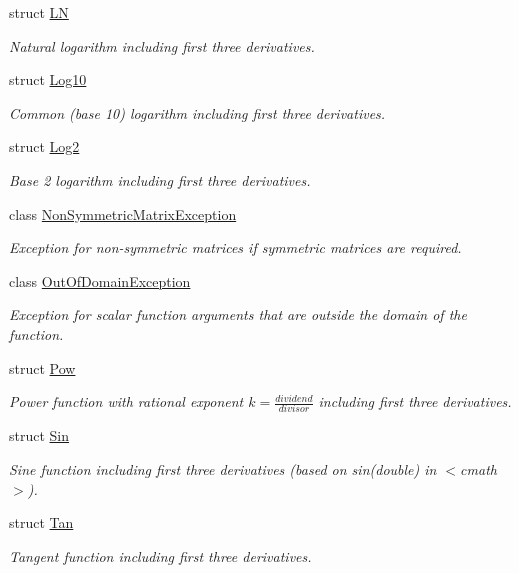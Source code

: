 \begin{DoxyCompactItemize}
struct \hyperlink{structFunG_1_1LN}{L\+N}
\begin{DoxyCompactList}\small\item\em Natural logarithm including first three derivatives. \end{DoxyCompactList}\item 
struct \hyperlink{structFunG_1_1Log10}{Log10}
\begin{DoxyCompactList}\small\item\em Common (base 10) logarithm including first three derivatives. \end{DoxyCompactList}\item 
struct \hyperlink{structFunG_1_1Log2}{Log2}
\begin{DoxyCompactList}\small\item\em Base 2 logarithm including first three derivatives. \end{DoxyCompactList}\item 
class \hyperlink{classFunG_1_1NonSymmetricMatrixException}{Non\+Symmetric\+Matrix\+Exception}
\begin{DoxyCompactList}\small\item\em Exception for non-\/symmetric matrices if symmetric matrices are required. \end{DoxyCompactList}\item 
class \hyperlink{classFunG_1_1OutOfDomainException}{Out\+Of\+Domain\+Exception}
\begin{DoxyCompactList}\small\item\em Exception for scalar function arguments that are outside the domain of the function. \end{DoxyCompactList}\item 
struct \hyperlink{structFunG_1_1Pow}{Pow}
\begin{DoxyCompactList}\small\item\em Power function with rational exponent $ k = \frac{dividend}{divisor} $ including first three derivatives. \end{DoxyCompactList}\item 
struct \hyperlink{structFunG_1_1Sin}{Sin}
\begin{DoxyCompactList}\small\item\em Sine function including first three derivatives (based on sin(double) in $<$cmath$>$). \end{DoxyCompactList}\item 
struct \hyperlink{structFunG_1_1Tan}{Tan}
\begin{DoxyCompactList}\small\item\em Tangent function including first three derivatives. \end{DoxyCompactList}\item 

\end{DoxyCompactItemize}
